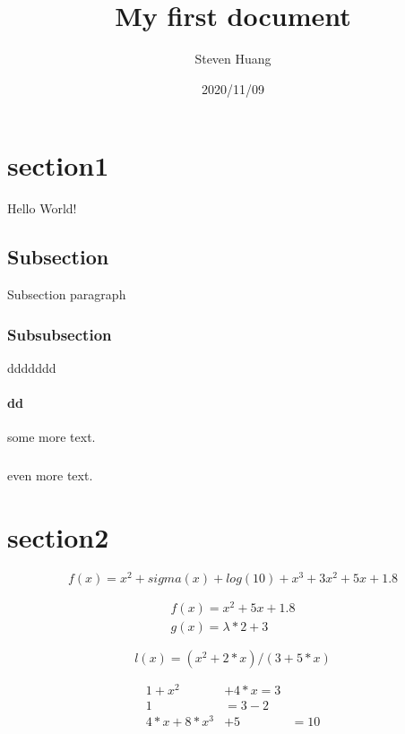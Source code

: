 \documentclass{article}
\title{ My first document}
\date{2020/11/09}
\author{Steven Huang}
\begin{document}
\maketitle
\newpage
{}

\section{section1}
Hello World!

\subsection{Subsection}
Subsection paragraph

\subsubsection{Subsubsection}
ddddddd

\paragraph{dd}
some more text.
\subparagraph{}
even more text.

\section{section2}
\begin{equation}
f(x)=x^2 + sigma(x) + log(10) + x^3 + 3x^2 + 5x + 1.8
\end{equation}

\begin{align}
f(x)=x^2 + 5x + 1.8\\
g(x)=\lambda*2+3
\end{align}

\begin{equation}
l(x)=(x^2 + 2*x)/(3+5*x)
\end{equation}

\begin{align}
  1 + x^2 & + 4*x= 3\\
  1 &= 3 - 2\\
  4*x+8*x^3 &+5&=10
\end{align}
\end{document}
